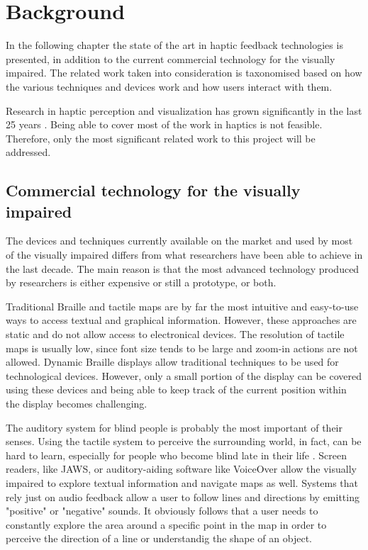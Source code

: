 \chapter{Background}

In the following chapter the state of the art in haptic feedback technologies is presented, in addition to the current commercial technology for the visually impaired. The related work taken into consideration is taxonomised based on how the various techniques and devices work and how users interact with them.

Research in haptic perception and visualization has grown significantly in the last 25 years \cite{roberts2007we}. Being able to cover most of the work in haptics is not feasible. Therefore, only the most significant related work to this project will be addressed.

\section{Commercial technology for the visually impaired}
The devices and techniques currently available on the market and used by most of the visually impaired differs from what researchers have been able to achieve in the last decade. The main reason is that the most advanced technology produced by researchers is either expensive or still a prototype, or both. 

Traditional Braille and tactile maps are by far the most intuitive and easy-to-use ways to access textual and graphical information. However, these approaches are static and do not allow access to electronical devices. The resolution of tactile maps is usually low, since font size tends to be large and zoom-in actions are not allowed. Dynamic Braille displays  allow traditional techniques to be used for technological devices. However, only a small portion of the display can be covered using these devices and being able to keep track of the current position within the display becomes challenging.

The auditory system for blind people is probably the most important of their senses. Using the tactile system to perceive the surrounding world, in fact, can be hard to learn, especially for people who become blind late in their life . Screen readers, like JAWS, or auditory-aiding software like VoiceOver\cite{voiceOver} allow the visually impaired to explore textual information and navigate maps as well. Systems that rely just on audio feedback allow a user to follow lines and directions by emitting "positive" or "negative" sounds. It obviously follows that a user needs to constantly explore the area around a specific point in the map in order to perceive the direction of a line or understandig the shape of an object.    
    
